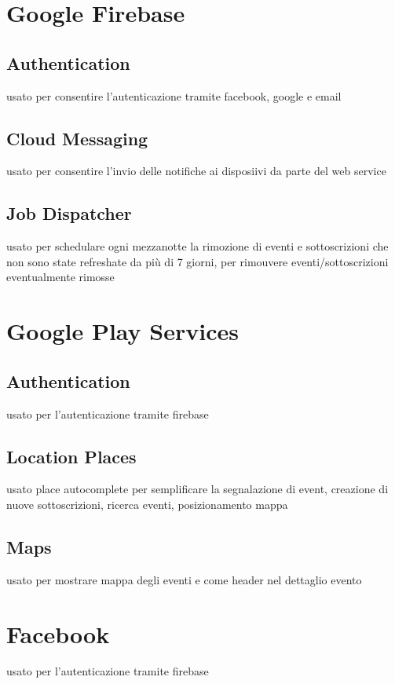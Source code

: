 \documentclass[a4paper]{scrreprt}
\begin{document}
\section{Google Firebase}

\subsection{Authentication}
usato per consentire l'autenticazione tramite facebook, google e email

\subsection{Cloud Messaging}
usato per consentire l'invio delle notifiche ai disposiivi da parte del web service

\subsection{Job Dispatcher}
usato per schedulare ogni mezzanotte la rimozione di eventi e sottoscrizioni che non sono state refreshate da più di 7 giorni, per rimouvere eventi/sottoscrizioni eventualmente rimosse

\section{Google Play Services}

\subsection{Authentication}
usato per l'autenticazione tramite firebase

\subsection{Location Places}
usato place autocomplete per semplificare la segnalazione di event, creazione di nuove sottoscrizioni, ricerca eventi, posizionamento mappa

\subsection{Maps}
usato per mostrare mappa degli eventi e come header nel dettaglio evento

\section{Facebook}
usato per l'autenticazione tramite firebase
\end{document}
